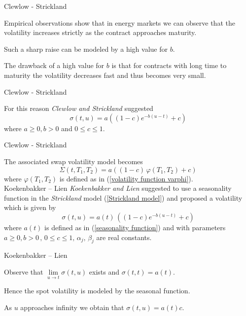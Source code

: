 {Clewlow - Strickland}






	Empirical observations show that in energy markets we can observe that the volatility increases strictly as the contract approaches maturity.


	Such a sharp raise can be modeled by a high value for $b$.


	The drawback of a high value for $b$ is that for contracts with long time to maturity the volatility decreases fast and thus becomes very small.





{Clewlow - Strickland}

For this reason \emph{Clewlow and Strickland} suggested
\begin{equation}
\sigma(t,u)=a((1-c)e^{-b(u-t)}+c) \label{Strickland model}
\end{equation}
where $a\ge 0, b > 0$ and $ 0 \le c\le 1$.

{Clewlow - Strickland}

The associated swap volatility model becomes
\begin{equation}
\Sigma(t,T_1,T_2)=a((1-c)\,\varphi(T_1,T_2)+c)
\end{equation}
where $\varphi(T_1,T_2)$ is defined as in (\ref{volatility function varphi}).\\

{Koekenbakker -- Lien}
\emph{Koekenbakker and Lien} suggested to use a seasonality function in the \emph{Strickland} model (\ref{Strickland model}) and proposed a volatility which is given by
\begin{equation}
\sigma(t,u)=a(t)\, ((1-c)e^{-b(u-t)}+c)
\end{equation}
where $a(t)$ is defined as in (\ref{seasonality function}) and with parameters $a \ge 0, b > 0\, ,\, 0 \le c \le 1, \,\alpha_j, \, \beta_j$ are real constants.

{Koekenbakker -- Lien}






	Observe that $\lim \limits_{u \to t} \sigma(t,u)$ exists and $\sigma(t,t)=a(t)$.


	Hence the spot volatility is modeled by the seasonal function.


	As $u$ approaches infinity we obtain that $\sigma(t,u)=a(t)c$.


